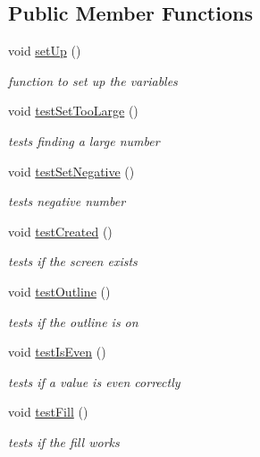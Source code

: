 \subsection*{Public Member Functions}
\begin{DoxyCompactItemize}
\item 
void \hyperlink{classScreenTest_a7eadae1233e3a94cc10b1f9defb66882}{set\-Up} ()
\begin{DoxyCompactList}\small\item\em function to set up the variables \end{DoxyCompactList}\item 
void \hyperlink{classScreenTest_a451b607eb14d10510479c7eda92c1d4e}{test\-Set\-Too\-Large} ()
\begin{DoxyCompactList}\small\item\em tests finding a large number \end{DoxyCompactList}\item 
void \hyperlink{classScreenTest_af3360263706600fd57fe101fdf22be5d}{test\-Set\-Negative} ()
\begin{DoxyCompactList}\small\item\em tests negative number \end{DoxyCompactList}\item 
void \hyperlink{classScreenTest_a4595a99a5ebbf7ee134cd6538ecace67}{test\-Created} ()
\begin{DoxyCompactList}\small\item\em tests if the screen exists \end{DoxyCompactList}\item 
void \hyperlink{classScreenTest_a20b2274b2fc94ec76fa67b84235ec328}{test\-Outline} ()
\begin{DoxyCompactList}\small\item\em tests if the outline is on \end{DoxyCompactList}\item 
void \hyperlink{classScreenTest_aef35856d8988e05958ebcf3418e87665}{test\-Is\-Even} ()
\begin{DoxyCompactList}\small\item\em tests if a value is even correctly \end{DoxyCompactList}\item 
void \hyperlink{classScreenTest_af0851953b701a861a0362cdc798f7388}{test\-Fill} ()
\begin{DoxyCompactList}\small\item\em tests if the fill works \end{DoxyCompactList}\item 

\end{DoxyCompactItemize}
